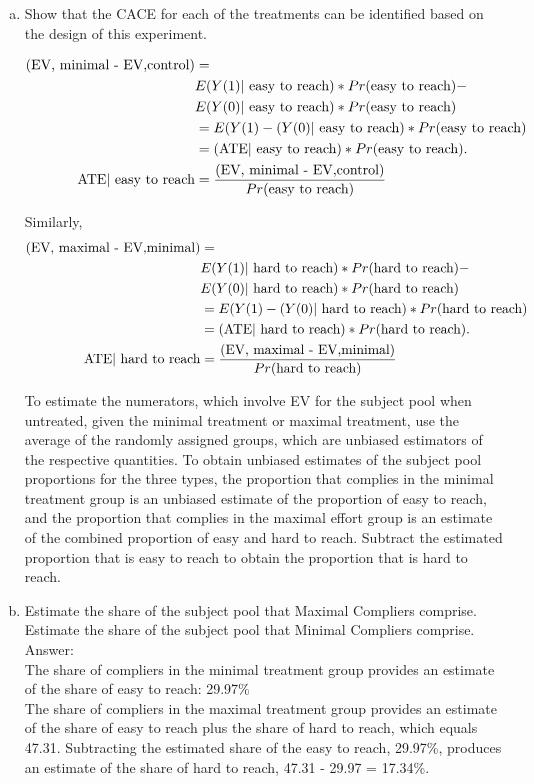 \documentclass[11pt,notitlepage]{article}\usepackage[]{graphicx}\usepackage[]{color}
\begin{document}
\begin{enumerate}[a)]
\item Show that the CACE for each of the treatments can be identified based on the design of this experiment.

\begin{align*}
\text{(EV, minimal - EV,control)} &= \\
&E(Y(1)|\text{ easy to reach})*Pr(\text{easy to reach}) - \\
&E(Y(0)|\text{ easy to reach})*Pr(\text{easy to reach}) \\
&= E(Y(1) -(Y(0)|\text{ easy to reach})*Pr(\text{easy to reach}) \\
&= (\text{ATE}|\text{ easy to reach})*Pr(\text{easy to reach}). \\
\text{ATE|\text{ easy to reach}} &= \frac{\text{(EV, minimal - EV,control)}}{Pr(\text{easy to reach})}
\end{align*}

Similarly, 
\begin{align*}
\text{(EV, maximal - EV,minimal)} &= \\
&E(Y(1)|\text{ hard to reach})*Pr(\text{hard to reach}) - \\
&E(Y(0)|\text{ hard to reach})*Pr(\text{hard to reach}) \\
&= E(Y(1) -(Y(0)|\text{ hard to reach})*Pr(\text{hard to reach}) \\
&= (\text{ATE}|\text{ hard to reach})*Pr(\text{hard to reach}). \\
\text{ATE|\text{ hard to reach}} &= \frac{\text{(EV, maximal - EV,minimal)}}{Pr(\text{hard to reach})}
\end{align*}

To estimate the numerators, which involve EV for the subject pool when untreated, given the minimal treatment or maximal treatment, use the average of the randomly assigned groups, which are unbiased estimators of the respective quantities.
To obtain unbiased estimates of the subject pool proportions for the three types, the proportion that complies in the minimal treatment group is an unbiased estimate of the proportion of easy to reach, and the proportion that complies in the maximal effort group is an estimate of the combined proportion of easy and hard to reach. Subtract the estimated proportion that is easy to reach to obtain the proportion that is hard to reach.


\item Estimate the share of the subject pool that Maximal Compliers comprise. Estimate the share of the subject pool that Minimal Compliers comprise.\\
Answer:\\
The share of compliers in the minimal treatment group provides an estimate of the share of easy to reach: 29.97\% \\
The share of compliers in the maximal treatment group provides an estimate of the share of easy to reach plus the share of hard to reach, which equals 47.31. Subtracting the estimated share of the easy to reach, 29.97\%, produces an estimate of the share of hard to reach, 47.31 - 29.97 = 17.34\%. 


\end{enumerate}
\end{document}
